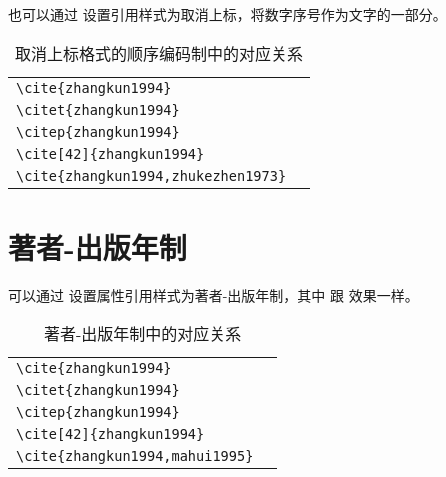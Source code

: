 \documentclass[report,oneside,UTF8,zihao=-4]{config}
\begin{document}
也可以通过  设置引用样式为取消上标，将数字序号作为文字的一部分。


\begin{table}[H]
  \centering
  \caption{取消上标格式的顺序编码制中的对应关系}
      \begin{tabular}{l@{\quad$\Rightarrow$\quad}l}
      \verb|\cite{zhangkun1994}|               & \cite{zhangkun1994}               \\
      \verb|\citet{zhangkun1994}|              & \citet{zhangkun1994}              \\
      \verb|\citep{zhangkun1994}|              & \citep{zhangkun1994}              \\
      \verb|\cite[42]{zhangkun1994}|           & \cite[42]{zhangkun1994}           \\
      \verb|\cite{zhangkun1994,zhukezhen1973}| & \cite{zhangkun1994,zhukezhen1973} \\
      \end{tabular}
\end{table}

\section{著者-出版年制}

可以通过  设置属性引用样式为著者-出版年制，其中  
跟  效果一样。


\begin{table}[H]
  \centering
  \caption{著者-出版年制中的对应关系}
      \begin{tabular}{l@{\quad$\Rightarrow$\quad}l}
      \verb|\cite{zhangkun1994}|           & \cite{zhangkun1994}           \\
      \verb|\citet{zhangkun1994}|          & \citet{zhangkun1994}          \\
      \verb|\citep{zhangkun1994}|          & \citep{zhangkun1994}          \\
      \verb|\cite[42]{zhangkun1994}|       & \cite[42]{zhangkun1994}       \\
      \verb|\cite{zhangkun1994,mahui1995}| & \cite{zhangkun1994,mahui1995} \\
      \end{tabular}
\end{table}
\end{document}
